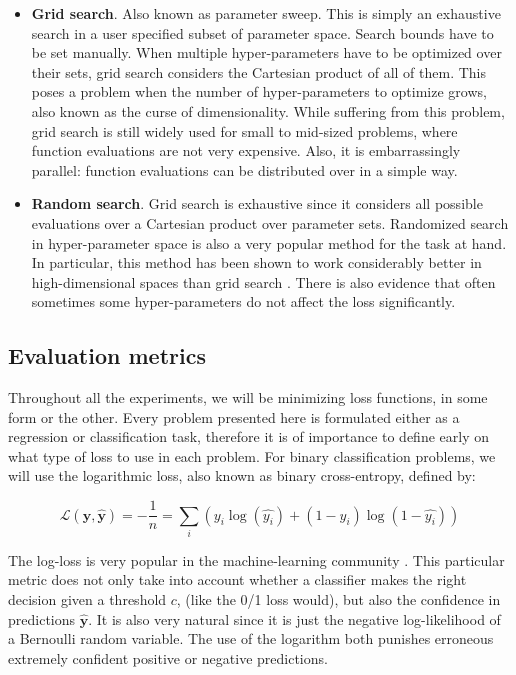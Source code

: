 \documentclass[10pt,a4paper,twoside]{book}
\begin{document}
\begin{itemize}
	\item \textbf{Grid search}. Also known as parameter sweep. This is simply an exhaustive search in a user specified subset of parameter space. Search bounds have to be set manually. When multiple hyper-parameters have to be optimized over their sets, grid search considers the Cartesian product of all of them. This poses a problem when the number of hyper-parameters to optimize grows, also known as the curse of dimensionality. While suffering from this problem, grid search is still widely used for small to mid-sized problems, where function evaluations are not very expensive. Also, it is embarrassingly parallel: function evaluations can be distributed over in a simple way.
	\item \textbf{Random search}. Grid search is exhaustive since it considers all possible evaluations over a Cartesian product over parameter sets. Randomized search in hyper-parameter space is also a very popular method for the task at hand. In particular, this method has been shown to work considerably better in high-dimensional spaces than grid search \cite{Bergstra2012}. There is also evidence that often sometimes some hyper-parameters do not affect the loss significantly.
\end{itemize}

\subsection{Evaluation metrics}
\label{evaluation}

Throughout all the experiments, we will be minimizing loss functions, in some form or the other. Every problem presented here is formulated either as a regression or classification task, therefore it is of importance to define early on what type of loss to use in each problem. For binary classification problems, we will use the logarithmic loss, also known as binary cross-entropy, defined by:

\begin{equation}
\mathcal{L}(\boldsymbol{y}, \boldsymbol{\hat{y}}) = -\dfrac{1}{n} = \sum_i \left(y_i \log(\hat{y_i}) + (1 - y_i)\log(1-\hat{y_i})\right)
\end{equation}

The log-loss is very popular in the machine-learning community \cite{Bishop2006}. This particular metric does not only take into account whether a classifier makes the right decision given a threshold $c$, (like the 0/1 loss would), but also the confidence in predictions $\boldsymbol{\hat{y}}$. It is also very natural since it is just the negative log-likelihood of a Bernoulli random variable. The use of the logarithm both punishes erroneous extremely confident positive or negative predictions.\\
\end{document}
